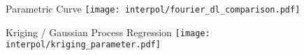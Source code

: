 



\begin{frame}[fragile]{Parametric Curve}
    \texttt{[image: interpol/fourier\_dl\_comparison.pdf]}
\end{frame}




%     


\begin{frame}{Kriging / Gaussian Process Regression}
    \texttt{[image: interpol/kriging\_parameter.pdf]}
\end{frame}

